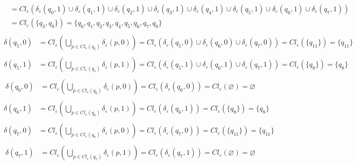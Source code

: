 \documentclass{article}
\begin{document}
\begin{enumerate}
\begin{align*}
          &= Cl_\varepsilon(\delta_\varepsilon(q_0,1) \cup \delta_\varepsilon(q_1,1) \cup \delta_\varepsilon(q_2, 1) \cup \delta_\varepsilon(q_3,1) \cup \delta_\varepsilon(q_4, 1) \cup \delta_\varepsilon(q_5,1) \cup \delta_\varepsilon(q_6, 1) \cup \delta_\varepsilon(q_7,1)) \\
          &= Cl_\varepsilon(\{q_3,q_8\}) = \{q_0,q_1,q_2,q_3,q_4,q_5,q_6,q_7,q_8\}\\
      \end{align*}
      \begin{align*}
        \delta(q_5, 0) &= Cl_{\varepsilon}(\bigcup_{p \in Cl_{\varepsilon}(q_5)} \delta_{\varepsilon}(p,0)) = Cl_\varepsilon(\delta_\varepsilon(q_5,0) \cup \delta_\varepsilon(q_6,0) \cup \delta_\varepsilon(q_7, 0)) = Cl_\varepsilon(\{q_{11}\}) = \{q_{11}\}\\
      \end{align*}
      \begin{align*}
        \delta(q_5, 1) &= Cl_{\varepsilon}(\bigcup_{p \in Cl_{\varepsilon}(q_5)} \delta_{\varepsilon}(p,1)) = Cl_\varepsilon(\delta_\varepsilon(q_5,1) \cup \delta_\varepsilon(q_6,1) \cup \delta_\varepsilon(q_7,1)) = Cl_\varepsilon(\{q_8\}) = \{q_8\}\\
      \end{align*}
      \begin{align*}
        \delta(q_6, 0) &= Cl_{\varepsilon}(\bigcup_{p \in Cl_{\varepsilon}(q_6)} \delta_{\varepsilon}(p,0)) = Cl_\varepsilon(\delta_\varepsilon(q_6,0)) = Cl_\varepsilon(\varnothing) = \varnothing\\ 
      \end{align*}
      \begin{align*}
        \delta(q_6, 1) &= Cl_{\varepsilon}(\bigcup_{p \in Cl_{\varepsilon}(q_6)} \delta_{\varepsilon}(p,1)) = Cl_\varepsilon(\delta_\varepsilon(q_6,1)) = Cl_\varepsilon(\{q_8\}) = \{q_8\}\\
      \end{align*}
      \begin{align*}
        \delta(q_7, 0) &= Cl_{\varepsilon}(\bigcup_{p \in Cl_{\varepsilon}(q_7)} \delta_{\varepsilon}(p,0)) = Cl_\varepsilon(\delta_\varepsilon(q_7,0)) = Cl_\varepsilon(\{q_{11}\}) = \{q_{11}\}\\
      \end{align*}
      \begin{align*}
        \delta(q_7, 1) &= Cl_{\varepsilon}(\bigcup_{p \in Cl_{\varepsilon}(q_7)} \delta_{\varepsilon}(p,1)) = Cl_\varepsilon(\delta_\varepsilon(q_7,1)) = Cl_\varepsilon(\varnothing) = \varnothing\\

\end{align*}
\end{enumerate}
\end{document}

